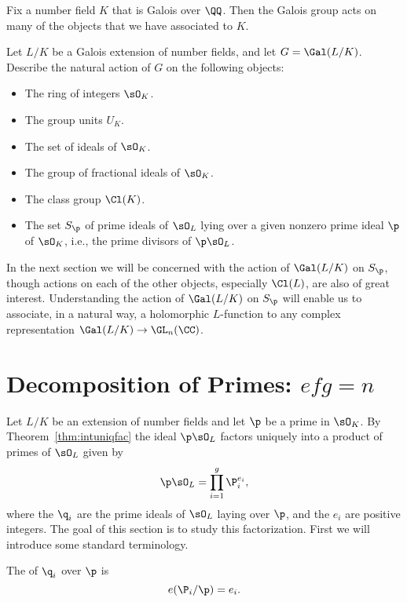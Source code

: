 Fix a number field $K$ that is Galois over $\QQ$.
Then the Galois group acts on many of the objects
that we have associated to $K$.

\begin{exercise}\label{ex:galois-action-on-things}
  Let $L/K$ be a Galois extension of number fields, and let $G = \Gal(L/K)$.
  Describe the natural action of $G$ on the following objects:
  \begin{itemize}
    \item The ring of integers $\sO_K$.
    \item The group units $U_K$.
    \item The set of ideals of $\sO_K$.
    \item The group of fractional ideals of $\sO_K$.
    \item The class group $\Cl(K)$.
    \item The set $S_\p$ of prime ideals of $\sO_L$ lying over a given nonzero
    prime ideal $\p$ of $\sO_K$, i.e., the prime divisors of $\p\sO_L$.
  \end{itemize}
\end{exercise}

In the next section we will be concerned with the action of
$\Gal(L/K)$ on $S_\p$, though actions on each of the other objects,
especially $\Cl(L)$, are also of great interest. Understanding the
action of $\Gal(L/K)$ on $S_{\p}$ will enable us to associate, in a
natural way, a holomorphic $L$-function to any complex representation
$\Gal(L/K) \to \GL_n(\CC)$.

\section{Decomposition of Primes: $efg=n$}

Let $L/K$ be an extension of number fields and let $\p$ be a prime
in $\sO_K$. By Theorem~\ref{thm:intuniqfac} the ideal $\p\sO_L$ factors
uniquely into a product of primes of $\sO_L$ given by
\[
  \p\sO_L = \prod_{i=1}^g \P^{e_i}_i,
\]
where the $\q_i$ are the prime ideals of $\sO_L$ laying over $\p$, and
the $e_i$ are positive integers. The goal of this section is to study this
factorization. First we will introduce some standard terminology.

\begin{definition}
  The  of $\q_i$ over $\p$ is
  \[
    e(\P_i/\p) = e_i.
  \]
\end{definition}

